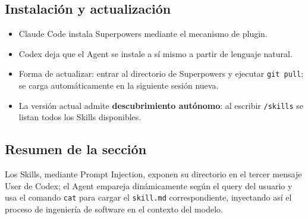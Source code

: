 \subsection{Instalación y actualización}

\begin{itemize}
    \item Claude Code instala Superpowers mediante el mecanismo de plugin.
    \item Codex deja que el Agent se instale a sí mismo a partir de lenguaje natural.
    \item Forma de actualizar: entrar al directorio de Superpowers y ejecutar \texttt{git pull}; se carga automáticamente en la siguiente sesión nueva.
    \item La versión actual admite \textbf{descubrimiento autónomo}: al escribir \texttt{/skills} se listan todos los Skills disponibles.
\end{itemize}

\subsection{Resumen de la sección}

Los Skills, mediante Prompt Injection, exponen su directorio en el tercer mensaje User de Codex; el Agent empareja dinámicamente según el query del usuario y usa el comando \texttt{cat} para cargar el \texttt{skill.md} correspondiente, inyectando así el proceso de ingeniería de software en el contexto del modelo.
